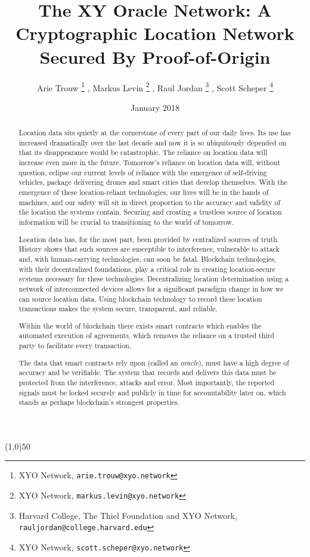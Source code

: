 \documentclass{article}
\title {The XY Oracle Network: A Cryptographic Location Network Secured By Proof-of-Origin}
\author{
	Arie Trouw
		\thanks{XYO Network, \texttt{arie.trouw@xyo.network}}
	, Markus Levin
		\thanks{XYO Network, \texttt{markus.levin@xyo.network}}
	, Raul Jordan
		\thanks{Harvard College, The Thiel Foundation and XYO Network, \texttt{rauljordan@college.harvard.edu}}
	, Scott Scheper
		\thanks{XYO Network, \texttt{scott.scheper@xyo.network}}
}
\date{January 2018}
\begin{document}
\maketitle

\begin{center}
\line(1,0){50}
\end{center}


\begin{abstract}
Location data sits quietly at the cornerstone of every part of our daily lives. Its use has increased dramatically over the last decade and now it is so ubiquitously depended on that its disappearance would be catastrophic. The reliance on location data will increase even more in the future. Tomorrow's reliance on location data will, without question, eclipse our current levels of reliance with the emergence of self-driving vehicles, package delivering drones and smart cities that develop themselves. With the emergence of these location-reliant technologies, our lives will be in the hands of machines, and our safety will sit in direct proportion to the accuracy and validity of the location the systems contain. Securing and creating a trustless source of location information will be crucial to transitioning to the world of tomorrow.

Location data has, for the most part, been provided by centralized sources of truth. History shows that such sources are susceptible to interference, vulnerable to attack and, with human-carrying technologies, can soon be fatal. Blockchain technologies, with their decentralized foundations, play a critical role in creating location-secure systems necessary for these technologies. Decentralizing location determination using a network of interconnected devices allows for a significant paradigm change in how we can source location data. Using blockchain technology to record these location transactions makes the system secure, transparent, and reliable. 

Within the world of blockchain there exists smart contracts which enables the automated execution of agreements, which removes the reliance on a trusted third party to facilitate every transaction. 

The data that smart contracts rely upon (called an \textit{oracle}), must have a high degree of accuracy and be verifiable. The system that records and delivers this data must be protected from the interference, attacks and error. Most importantly, the reported signals must be locked securely and publicly in time for accountability later on, which stands as perhaps blockchain's strongest properties.


\end{abstract}
\end{document}

